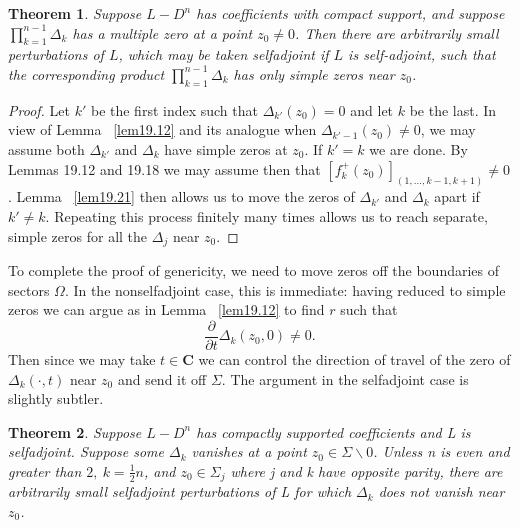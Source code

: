 \documentclass{surv-l}
\theoremstyle{plain}
\newtheorem{theorem}{Theorem}[section]
\theoremstyle{definition}
\numberwithin{equation}{chapter}
\begin{document}
\begin{theorem}\label{thm19.23}  Suppose $L-D^{n}$ has coefficients with compact support,
and suppose $\prod_{k=1}^{n-1}\Delta_{k}$ has a multiple zero at a point $z_{0}\neq 0$. Then there are arbitrarily small perturbations of $L$, which may be taken selfadjoint if $L$ is self-adjoint, such that the corresponding product $\prod_{k=1}^{n-1}\Delta_{k}$ has only simple zeros near $z_{0}$.
\end{theorem}
\begin{proof} Let $k'$ be the first index such that $\Delta_{k'}(z_{0})=0$ and let $k$ be the last. In view of Lemma ~\ref{lem19.12} and its analogue when $\Delta_{k'-1}(z_{0})\neq 0$, we may assume both $\Delta_{k'}$ and $\Delta_{k}$ have simple zeros at $z_{0}$. If $k'=k$ we are done. By Lemmas 19.12 and 19.18 we may assume then that $[f_{k}^{+}(z_{0})]_{(1,\ldots, k-1,k+1)}\neq 0$. Lemma ~\ref{lem19.21} then allows us to move the zeros of $\Delta_{k'}$ and $\Delta_{k}$ apart if $k'\neq k$. Repeating this process finitely many times allows us to reach separate, simple zeros for all the $\Delta_{j}$ near $z_{0}.$
\end{proof}
To complete the proof of genericity, we need to move zeros off the boundaries of sectors $\Omega$. In the nonselfadjoint case, this is immediate: having reduced to simple zeros we can argue as in Lemma ~\ref{lem19.12} to find $r$ such that
\begin{equation*}
\frac{\partial}{\partial t}\Delta_{k}(z_{0},0)\neq 0.
\end{equation*}
Then since we may take $t\in \mathbf{C}$ we can control the direction of travel of the zero of $\Delta_{k}(\cdot, t)$ near $z_{0}$ and send it off $\Sigma$. The argument in the selfadjoint case is slightly subtler.

\begin{theorem}\label{thm19.24}
Suppose $L-D^{n}$  has compactly supported coefficients and L is selfadjoint. Suppose some $\Delta_{k}$ vanishes at a point $z_{0}\in\Sigma\backslash 0$. Unless n is even and greater than $2,\ k=\frac{1}{2}n$, and $z_{0}\in\Sigma_{j}$ where j and k have opposite parity, there are arbitrarily small selfadjoint perturbations of L for which $\Delta_{k}$ does not vanish near $z_{0}$.
\end{theorem}
\end{document}
